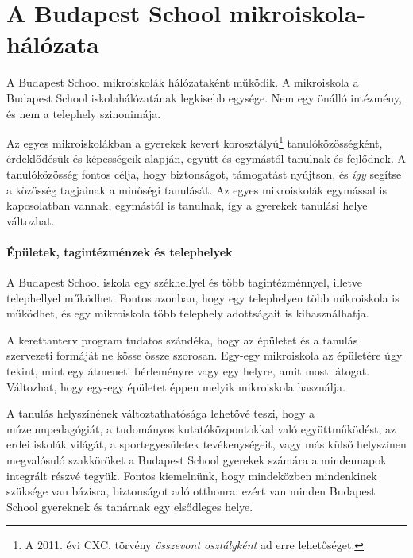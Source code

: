 \section{A Budapest School mikroiskola-hálózata}


A Budapest School mikroiskolák hálózataként működik. A mikroiskola a Budapest
School iskolahálózatának legkisebb egysége. Nem egy önálló intézmény, és nem a
telephely szinonimája.

Az egyes mikroiskolákban a gyerekek kevert korosztályú\footnote{A 2011. évi CXC. törvény
\emph{összevont osztályként} ad erre lehetőséget. } tanulóközösségként,
érdeklődésük és képességeik alapján, együtt és egymástól tanulnak és fejlődnek.
A tanulóközösség fontos célja, hogy biztonságot, támogatást nyújtson, és
\emph{így} segítse a közösség tagjainak a minőségi tanulását. Az egyes
mikroiskolák egymással is kapcsolatban vannak,
egymástól is tanulnak, így a gyerekek tanulási helye változhat.

\paragraph{Épületek, tagintézménzek és telephelyek}
A Budapest School iskola egy székhellyel és több tagintézménnyel, illetve
telephellyel működhet. Fontos azonban, hogy egy telephelyen több mikroiskola is
működhet, és egy mikroiskola több telephely adottságait is kihasználhatja.

A 
\ifkerettanterv
kerettanterv
\else
program
\fi tudatos szándéka, hogy az épületet és a
tanulás szervezeti formáját ne kösse össze szorosan. Egy-egy mikroiskola az
épületére úgy tekint, mint egy átmeneti bérleményre vagy egy helyre, amit most
látogat.
Változhat, hogy egy-egy épületet éppen melyik mikroiskola használja.

A tanulás helyszínének változtathatósága lehetővé teszi, hogy a
múzeumpedagógiát, a tudományos kutatóközpontokkal való együttműködést, az erdei
iskolák világát, a sportegyesületek tevékenységeit, vagy más külső helyszínen
megvalósuló szakköröket a Budapest School gyerekek számára a mindennapok
integrált részvé tegyük. Fontos kiemelnünk, hogy mindeközben mindenkinek
szüksége van bázisra, biztonságot adó otthonra: ezért van minden Budapest
School gyereknek és tanárnak egy elsődleges helye.
\ifkerettanterv
